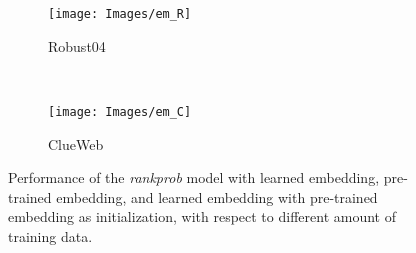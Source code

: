 \documentclass[sigconf]{acmart}
\newcommand{\modelthree}{\textit{rank\-prob} model\xspace}
\begin{document}
\begin{figure}[t]
    \centering
    \begin{subfigure}[t]{0.24\textwidth}
        \centering
        \texttt{[image: Images/em\_R]}
        \caption{\label{fig:embedding_r}Robust04\vspace*{-3ex}}
    \end{subfigure}~
    \begin{subfigure}[t]{0.24\textwidth}
        \centering
        \texttt{[image: Images/em\_C]}
        \caption{\label{fig:embedding_c}ClueWeb\vspace*{-3ex}}
    \end{subfigure}\caption{\label{fig:embedding}Performance of the \modelthree with learned embedding, pre-trained embedding, and learned embedding with pre-trained embedding as initialization, with respect to different amount of training data.}
    \vspace{-10pt}
\end{figure}
\end{document}
